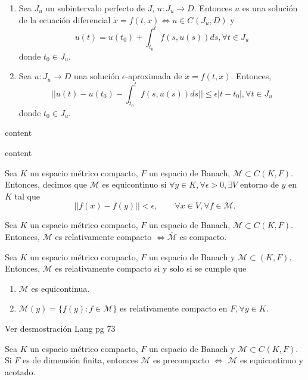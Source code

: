 \begin{prop}
  \begin{enumerate}[label=(\roman*)]
    \item Sea $J_{u}$ un subintervalo perfecto de $J$, $u: J_{u} \to D$. Entonces $u$ es una solución de la ecuación diferencial $\dot{x} = f(t,x) \Leftrightarrow u \in C^{}(J_{u}, D)$ y
      \[ 
        u(t) = u(t_{0}) + \int_{t_{0}}^{t} f(s, u(s)) ds, \forall t \in J_{u} 
      \] 
      donde $t_{0} \in J_{u}$.
    \item Sea $u: J_{u} \to D$ una solución $\epsilon$-aproximada de $\dot{x} = f(t,x)$. Entonces,
      \[ 
        ||u(t) - u(t_{0}) - \int_{t_{0}}^{t} f(s, u(s)) ds|| \leq \epsilon | t - t_{0} |, \forall t \in J_{u} 
      \] 
      donde $t_{0} \in J_{u}$.
  \end{enumerate}
\end{prop}

\begin{lem}[6.6]
  content
\end{lem}

\begin{theo}[6.7]
  content
\end{theo}

\begin{defn}[Equicontinuidad]
  Sea $K$ un espacio métrico compacto, $F$ un espacio de Banach, $\mathcal{M} \subset C^{}(K, F)$. Entonces, decimos que $\mathcal{M}$ es equicontinuo si $\forall y \in K, \forall \epsilon > 0, \exists V$ entorno de $y$ en $K$ tal que
  \[ 
    ||f(x) - f(y)|| < \epsilon, \qquad \forall x \in V, \forall f \in \mathcal{M} .
  \] 
\end{defn}

\begin{prop}
  Sea $K$ un espacio métrico compacto, $F$ un espacio de Banach, $\mathcal{M} \subset C^{}(K, F)$. Entonces, $\mathcal{M}$ es relativamente compacto $\Leftrightarrow \overline{\mathcal{M}}$ es compacto.
\end{prop}
\begin{theo}
  Sea $K$ un espacio métrico compacto, $F$ un espacio de Banach y $\mathcal{M} \subset(K,F)$. Entonces, $ \mathcal{M}$ es relativamente compacto si y solo si se cumple que
  \begin{enumerate}[label=(\roman*)]
    \item $\mathcal{M}$ es equicontinua.
    \item $\mathcal{M}(y) = \{ f(y) : f \in \mathcal{M} \}$ es relativamente compacto en $F, \forall y \in K$.
  \end{enumerate}
\end{theo}

\begin{dem}
  Ver desmostración Lang pg 73
\end{dem}

\begin{cor}[Precompacidad]
  Sea $K$ un espacio métrico compacto, $F$ un espacio de Banach y $\mathcal{M}\subset C^{}(K, F)$. Si $F$ es de dimensión finita, entonces $\mathcal{M}$ es precompacto $\Leftrightarrow$ $\mathcal{M}$ es equicontinuo y acotado.
\end{cor}


